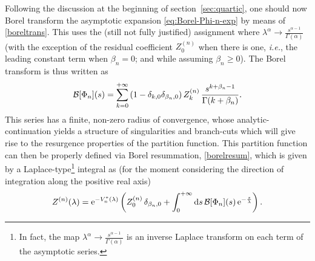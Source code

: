 \documentclass[11pt,a4paper]{article}
\newcommand{\CB}{{\cal B}}
\newcommand{\rme}{{\mathrm{e}}}
\newcommand{\rmd}{{\mathrm{d}}}
\begin{document}
Following the discussion at the beginning of section~\ref{sec:quartic}, one should now Borel transform the asymptotic expansion \eqref{eq:Borel-Phi-n-exp} by means of \eqref{boreltrans}. This uses the (still not fully justified) assignment where $\lambda^{\alpha} \to \frac{s^{\alpha-1}}{\Gamma (\alpha)}$ (with the exception of the residual coefficient $Z_{0}^{(n)}$ when there is one, \textit{i.e.}, the leading constant term when $\beta_{n}=0$; and while assuming $\beta_n \ge 0$). The Borel transform is thus written as
%
\begin{equation}
\label{eq:Borel-Phi-n-transf-exp}
\CB[\Phi_n] (s) = \sum_{k=0}^{+\infty} \left( 1 - \delta_{k,0} \delta_{\beta_{n},0} \right) Z_{k}^{(n)}\, \frac{s^{k+\beta_n-1}}{\Gamma (k+\beta_n)}.
\end{equation}
%
\noindent
This series has a finite, non-zero radius of convergence, whose analytic-continuation yields a structure of singularities and branch-cuts which will give rise to the resurgence properties of the partition function. This partition function can then be properly defined via Borel resummation, \eqref{borelresum}, which is given by a Laplace-type\footnote{In fact, the map $\lambda^{\alpha} \to \frac{s^{\alpha-1}}{\Gamma (\alpha)}$ is an inverse Laplace transform on each term of the asymptotic series.} integral as (for the moment considering the direction of integration along the positive real axis)
%
\begin{equation}
\label{eq:Borel-Laplace-at-zero}
Z^{(n)} (\lambda) = \rme^{- V^*_n (\lambda)} \left( Z_{0}^{(n)}\, \delta_{\beta_{n},0} + \int_{0}^{+\infty} \rmd s\, \CB[\Phi_{n}](s)\, \rme^{-\frac{s}{\lambda}} \right).
\end{equation}
\end{document}

